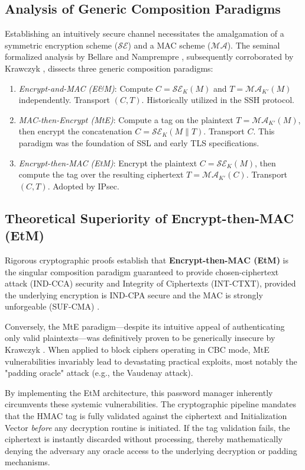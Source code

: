 \subsection{Analysis of Generic Composition Paradigms}
Establishing an intuitively secure channel necessitates the amalgamation of a symmetric encryption scheme ($\mathcal{SE}$) and a MAC scheme ($\mathcal{MA}$). The seminal formalized analysis by Bellare and Namprempre \cite{bellare2000}, subsequently corroborated by Krawczyk \cite{krawczyk2001}, dissects three generic composition paradigms:
\begin{enumerate}
    \item \textit{Encrypt-and-MAC (E\&M)}: Compute $C = \mathcal{SE}_K(M)$ and $T = \mathcal{MA}_{K'}(M)$ independently. Transport $(C, T)$. Historically utilized in the SSH protocol.
    \item \textit{MAC-then-Encrypt (MtE)}: Compute a tag on the plaintext $T = \mathcal{MA}_{K'}(M)$, then encrypt the concatenation $C = \mathcal{SE}_K(M \parallel T)$. Transport $C$. This paradigm was the foundation of SSL and early TLS specifications.
    \item \textit{Encrypt-then-MAC (EtM)}: Encrypt the plaintext $C = \mathcal{SE}_K(M)$, then compute the tag over the resulting ciphertext $T = \mathcal{MA}_{K'}(C)$. Transport $(C, T)$. Adopted by IPsec.
\end{enumerate}

\subsection{Theoretical Superiority of Encrypt-then-MAC (EtM)}
Rigorous cryptographic proofs establish that \textbf{Encrypt-then-MAC (EtM)} is the singular composition paradigm guaranteed to provide chosen-ciphertext attack (IND-CCA) security and Integrity of Ciphertexts (INT-CTXT), provided the underlying encryption is IND-CPA secure and the MAC is strongly unforgeable (SUF-CMA) \cite{bellare2000}.

Conversely, the MtE paradigm—despite its intuitive appeal of authenticating only valid plaintexts—was definitively proven to be generically insecure by Krawczyk \cite{krawczyk2001}. When applied to block ciphers operating in CBC mode, MtE vulnerabilities invariably lead to devastating practical exploits, most notably the "padding oracle" attack (e.g., the Vaudenay attack). 

By implementing the EtM architecture, this password manager inherently circumvents these systemic vulnerabilities. The cryptographic pipeline mandates that the HMAC tag is fully validated against the ciphertext and Initialization Vector \textit{before} any decryption routine is initiated. If the tag validation fails, the ciphertext is instantly discarded without processing, thereby mathematically denying the adversary any oracle access to the underlying decryption or padding mechanisms.
